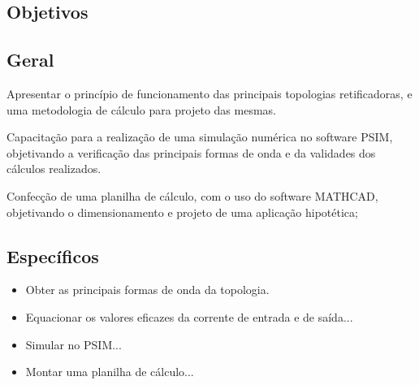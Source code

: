 \documentclass[
	article,			%
	12pt,				%
	twoside,			%
	a4paper,			%
	english,			%
	brazil,				%
	sumario=tradicional
]{abntex2-modelo-plano-de-aula}
\begin{document}

\frenchspacing 



\imprimirletterUFSC





\textual
\pagestyle{notasUFSC}



\begin{snugshade}
	\section{Objetivos} %
\end{snugshade}

\subsection{Geral} %

Apresentar o princípio de funcionamento das principais topologias retificadoras,
e uma metodologia de cálculo para projeto das mesmas.

Capacitação para a realização de uma simulação numérica no software PSIM, objetivando a verificação das principais formas de onda e da validades dos cálculos realizados.

Confecção de uma planilha de cálculo, com o uso do software MATHCAD, objetivando o dimensionamento e projeto de uma aplicação hipotética;




\subsection{Específicos} %

\begin{itemize}
	
	\item Obter as principais formas de onda da topologia.
	\item Equacionar os valores eficazes da corrente de entrada e de saída...
	\item Simular no PSIM... 
	\item Montar uma planilha de cálculo...
	
\end{itemize}
\end{document}
